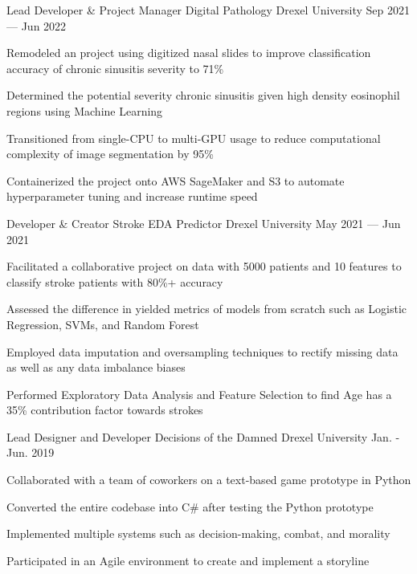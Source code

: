
\begin{cventries}
  \cventry
    {Lead Developer \& Project Manager} %
    {Digital Pathology} %
    {Drexel University} %
    {Sep 2021 --- Jun 2022} %
    {
      \begin{cvitems} %
        \item{Remodeled an project using digitized nasal slides to improve classification accuracy of chronic sinusitis severity to 71\%}
        \item{Determined the potential severity chronic sinusitis given high density eosinophil regions using Machine Learning}
        \item{Transitioned from single-CPU to multi-GPU usage to reduce computational complexity of image segmentation by 95\%}
        \item{Containerized the project onto AWS SageMaker and S3 to automate hyperparameter tuning and increase runtime speed}
      \end{cvitems}
    }
    
    \cventry
    {Developer \& Creator} %
    {Stroke EDA Predictor} %
    {Drexel University} %
    {May 2021 --- Jun 2021} %
    {
      \begin{cvitems} %
        \item{Facilitated a collaborative project on data with 5000 patients and 10 features to classify stroke patients with 80\%+ accuracy}
        \item{Assessed the difference in yielded metrics of models from scratch such as Logistic Regression, SVMs, and Random Forest}
        \item{Employed data imputation and oversampling techniques to rectify missing data as well as any data imbalance biases}
		\item{Performed Exploratory Data Analysis and Feature Selection to find Age has a 35\% contribution factor towards strokes}
      \end{cvitems}
    }
    
    \cventry
    {Lead Designer and Developer} %
    {Decisions of the Damned} %
    {Drexel University} %
    {Jan. - Jun. 2019} %
    {
      \begin{cvitems} %
        \item{Collaborated with a team of coworkers on a text-based game prototype in Python}
        \item{Converted the entire codebase into C\# after testing the Python prototype}
		\item{Implemented multiple systems such as decision-making, combat, and morality}
		\item{Participated in an Agile environment to create and implement a storyline}
      \end{cvitems}
    }
    
\end{cventries}
